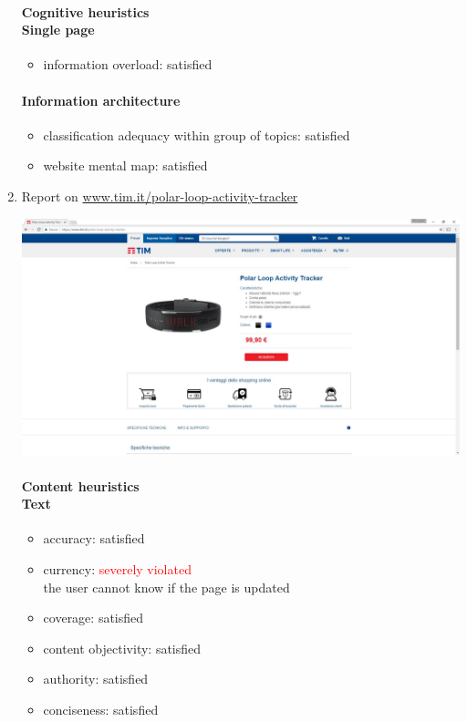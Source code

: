 \begin{enumerate}
	\paragraph*{Cognitive heuristics \\ Single page}
	\begin{itemize}
		\item information overload: satisfied
	\end{itemize}	
	
	\paragraph*{Information architecture}
	\begin{itemize}
		\item classification adequacy within group of topics: satisfied
		\item website mental map: satisfied
	\end{itemize}

\newpage


\item Report on \url{www.tim.it/polar-loop-activity-tracker}

\begin{center}
	\includegraphics[width=\textwidth]{Screenshot/loop.jpg}
\end{center}
\vspace{1cm}

	\paragraph*{Content heuristics \\ Text}
	\begin{itemize}
		\item accuracy: satisfied
		\item currency: \textcolor{red}{severely violated}\\
		the user cannot know if the page is updated
		\item coverage: satisfied
		\item content objectivity: satisfied
		\item authority: satisfied
		\item conciseness: satisfied		
	\end{itemize}
	

\end{enumerate}
